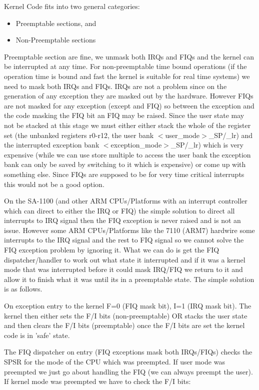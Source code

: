 \documentclass[a4paper,10pt,twoside]{article}
\begin{document}
Kernel Code fits into two general categories:

\begin{itemize}
\item Preemptable sections, and
\item Non-Preemptable sections
\end{itemize}

Preemptable section are fine, we unmask both IRQs and FIQs and the kernel can
be interrupted at any time. For non-preemptable time bound operations (if the
operation time is bound and fast the kernel is suitable for real time systems)
we need to mask both IRQs and FIQs. IRQs are not a problem since on the
generation of any exception they are masked out by the hardware. However FIQs
are not masked for any exception (except and FIQ) so between the exception
and the code masking the FIQ bit an FIQ may be raised. Since the user state
may not be stacked at this stage we must either either stack the whole of the
register set (the unbanked registers r0-r12, the user bank
$<$user\_mode$>$\_SP/\_lr) and the interrupted exception bank
$<$exception\_mode$>$\_SP/\_lr) which is very expensive (while we can use
store multiple to access the user bank the exception bank can only be saved
by switching to it which is expensive) or come up with something else. Since
FIQs are supposed to be for very time critical interrupts this would not be
a good option.

On the SA-1100 (and other ARM CPUs/Platforms with an interrupt controller
which can direct to either the IRQ or FIQ) the simple solution to direct all
interrupts to IRQ signal then the FIQ exception is never raised and is not an
issue. However some ARM CPUs/Platforms like the 7110 (ARM7) hardwire some
interrupts to the IRQ signal and the rest to FIQ signal so we cannot solve
the FIQ exception problem by ignoring it. What we can do is get the FIQ
dispatcher/handler to work out what state it interrupted and if it was a
kernel mode that was interrupted before it could mask IRQ/FIQ we return to it
and allow it to finish what it was until its in a preemptable state. The
simple solution is as follows.

On exception entry to the kernel F=0 (FIQ mask bit), I=1 (IRQ mask bit). The
kernel then either sets the F/I bits (non-preemptable) OR stacks the user
state and then clears the F/I bits (preemptable) once the F/I bits are set
the kernel code is in 'safe' state.

The FIQ dispatcher on entry (FIQ exceptions mask both IRQs/FIQs) checks the
SPSR for the mode of the CPU which was preempted. If user mode was preempted
we just go about handling the FIQ (we can always preempt the user). If kernel
mode was preempted we have to check the F/I bits:
\end{document}

